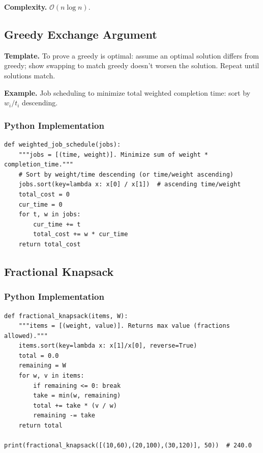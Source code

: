 \documentclass[10pt,a4paper]{article}
\theoremstyle{cpstyle}
\newcommand{\bigO}[1]{\mathcal{O}\!\left(#1\right)}
\begin{document}
\textbf{Complexity.} $\bigO{n \log n}$.

\subsection{Greedy Exchange Argument}

\textbf{Template.} To prove a greedy is optimal: assume an optimal solution differs from greedy; show swapping to match greedy doesn't worsen the solution. Repeat until solutions match.

\textbf{Example.} Job scheduling to minimize total weighted completion time: sort by $w_i / t_i$ descending.

\subsubsection{Python Implementation}
\begin{lstlisting}[caption={Weighted job scheduling -- minimize weighted completion time}]
def weighted_job_schedule(jobs):
    """jobs = [(time, weight)]. Minimize sum of weight * completion_time."""
    # Sort by weight/time descending (or time/weight ascending)
    jobs.sort(key=lambda x: x[0] / x[1])  # ascending time/weight
    total_cost = 0
    cur_time = 0
    for t, w in jobs:
        cur_time += t
        total_cost += w * cur_time
    return total_cost
\end{lstlisting}

\subsection{Fractional Knapsack}

\subsubsection{Python Implementation}
\begin{lstlisting}[caption={Fractional Knapsack}]
def fractional_knapsack(items, W):
    """items = [(weight, value)]. Returns max value (fractions allowed)."""
    items.sort(key=lambda x: x[1]/x[0], reverse=True)
    total = 0.0
    remaining = W
    for w, v in items:
        if remaining <= 0: break
        take = min(w, remaining)
        total += take * (v / w)
        remaining -= take
    return total

print(fractional_knapsack([(10,60),(20,100),(30,120)], 50))  # 240.0
\end{lstlisting}
\end{document}
